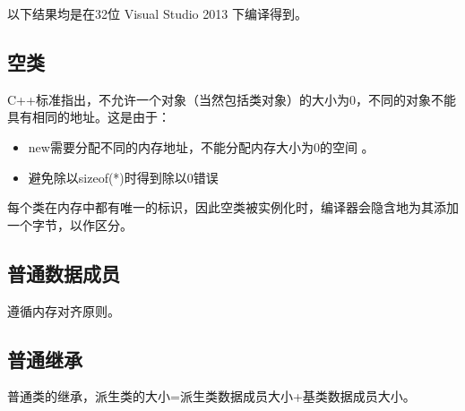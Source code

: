 \documentclass[letterpaper,10pt,english]{sphinxmanual}
\begin{document}
以下结果均是在32位 Visual Studio 2013 下编译得到。


\subsection{空类}
\label{\detokenize{cpp/04_classSize:id2}}
C++标准指出，不允许一个对象（当然包括类对象）的大小为0，不同的对象不能具有相同的地址。这是由于：
\begin{itemize}
\item {} 
new需要分配不同的内存地址，不能分配内存大小为0的空间 。

\item {} 
避免除以sizeof(*)时得到除以0错误

\end{itemize}

每个类在内存中都有唯一的标识，因此空类被实例化时，编译器会隐含地为其添加一个字节，以作区分。

%
\begin{sphinxVerbatim}[commandchars=\\\{\},numbers=left,firstnumber=1,stepnumber=1]
 
\end{sphinxVerbatim}


\subsection{普通数据成员}
\label{\detokenize{cpp/04_classSize:id3}}
遵循内存对齐原则。

%
\begin{sphinxVerbatim}[commandchars=\\\{\},numbers=left,firstnumber=1,stepnumber=1]
 
     
     

 
     
     
\end{sphinxVerbatim}


\subsection{普通继承}
\label{\detokenize{cpp/04_classSize:id4}}
普通类的继承，派生类的大小=派生类数据成员大小+基类数据成员大小。
\end{document}

